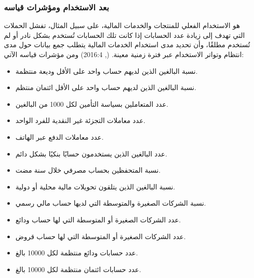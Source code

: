 \documentclass[10pt,a4paper]{report}
\begin{document}
\begin{doublespacing}
\subsubsection{بعد الاستخدام ومؤشرات قياسه}
هو الاستخدام الفعلي للمنتجات والخدمات المالية، على سبيل المثال، تفشل الحملات التي تهدف إلى زيادة عدد الحسابات إذا كانت تلك الحسابات تُستخدم بشكل نادر أو لم تُستخدم مطلقًا، وأن تحديد مدى استخدام الخدمات المالية يتطلب جمع بيانات حول مدى انتظام وتواتر الاستخدام عبر فترة زمنية معينة. (, 2016:4) ومن مؤشرات قياسه الآتي:
\begin{itemize}
	\item نسبة البالغين الذين لديهم حساب واحد على الأقل وديعة منتظمة.
	\item نسبة البالغين الذين لديهم حساب واحد على الأقل ائتمان منتظم.
	\item عدد المتعاملين بسياسة التأمين لكل 1000 من البالغين.
	\item عدد معاملات التجزئة غير النقدية للفرد الواحد.
	\item عدد معاملات الدفع عبر الهاتف.
	\item عدد البالغين الذين يستخدمون حسابًا بنكيًا بشكل دائم.
	\item نسبة المتحفظين بحساب مصرفي خلال سنة مضت.
	\item نسبة البالغين الذين يتلقون تحويلات مالية محلية أو دولية.
	\item نسبة الشركات الصغيرة والمتوسطة التي لديها حساب مالي رسمي.
	\item عدد الشركات الصغيرة أو المتوسطة التي لها حساب ودائع.
	\item عدد الشركات الصغيرة أو المتوسطة التي لها حساب قروض.
	\item عدد حسابات ودائع منتظمة لكل 10000 بالغ.
	\item عدد حسابات ائتمان منتظمة لكل 10000 بالغ.
\end{itemize}

\end{doublespacing}
\end{document}

